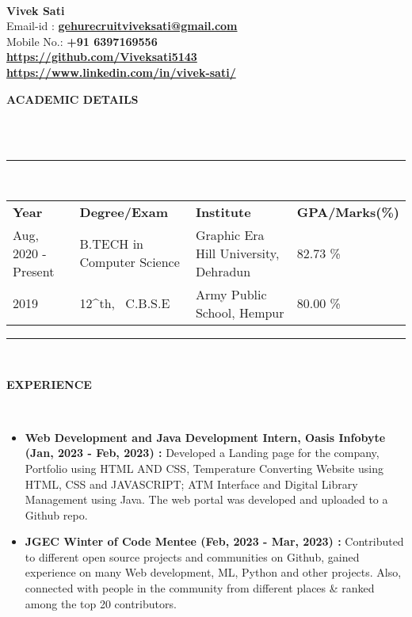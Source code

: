 \documentclass[a4paper,10pt]{article}
\newcommand{\lsep}{-0.5cm}
\newcommand{\resheading}[1]{{\small \colorbox{mygrey}{\begin{minipage}{0.975\textwidth}{\textbf{#1 \vphantom{p\^{E}}}}\end{minipage}}}}
\begin{document}
\hspace{0.5cm}\\[-0.2cm]

\textbf{Vivek Sati} \\
\indent Email-id : \textbf{\url{gehurecruitviveksati@gmail.com}} \\
\indent Mobile No.: \textbf{+91 6397169556} \ \\
\indent \textbf{\url{https://github.com/Viveksati5143}}\\
\indent \textbf{\url{https://www.linkedin.com/in/vivek-sati/}}\\

\resheading{\textbf{ACADEMIC DETAILS} }\\[\lsep]
\\
\indent \rule{6.8in}{0.4pt}\\
\indent \begin{tabular}{ l @{\hskip 0.15in} l @{\hskip 0.15in} l @{\hskip 0.15in} l @{\hskip 0.15in} }
\noindent \textbf{Year} & \textbf{Degree/Exam} & \textbf{Institute} & \textbf{GPA/Marks(\%)} \\
Aug, 2020 - Present & B.TECH in Computer Science & Graphic Era Hill University, Dehradun & 82.73 \% \\
2019 & 12^{th}, \ C.B.S.E & Army Public School, Hempur & 80.00 \% \\

\end{tabular}
\indent \rule{6.8in}{0.4pt}
\\

\resheading{\textbf{EXPERIENCE} }\\[\lsep]
\begin{itemize}
\setlength\itemsep{0.5em}
\item \textbf{Web Development and Java Development Intern, Oasis Infobyte (Jan, 2023 - Feb, 2023) : }Developed
a Landing page for the company, Portfolio using HTML AND CSS, Temperature Converting Website using HTML, CSS and JAVASCRIPT; ATM Interface and Digital Library Management using Java.
The web portal was developed and uploaded to a Github repo.
\item \textbf{JGEC Winter of Code Mentee (Feb, 2023 - Mar, 2023) : }Contributed to different open source projects and communities on Github, gained experience on many Web development, ML, Python and other projects. Also, connected with people in the community from different places \& ranked among the top 20 contributors.
\end{itemize}
\end{document}
